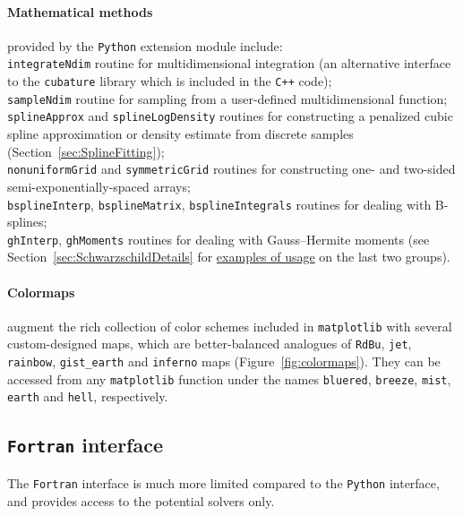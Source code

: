 \documentclass[12pt]{article}
\newcommand{\Cpp}  {\texttt{C++}\xspace}
\newcommand{\Python}{\texttt{Python}\xspace}
\newcommand{\Fortran}{\texttt{Fortran}\xspace}
\newcommand{\ppp}[1]{\textcolor{darkolive} {\texttt{#1}}}
\begin{document}
\paragraph{Mathematical methods} provided by the \Python extension module include:\\
\texttt{integrateNdim} routine for multidimensional integration (an alternative interface to the \texttt{cubature} library which is included in the \Cpp code);\\
\texttt{sampleNdim} routine for sampling from a user-defined multidimensional function;\\
\texttt{splineApprox} and \texttt{splineLogDensity} routines for constructing a penalized cubic spline approximation or density estimate from discrete samples (Section~\ref{sec:SplineFitting});\\
\texttt{nonuniformGrid} and \texttt{symmetricGrid} routines for constructing one- and two-sided semi-exponentially-spaced arrays;\\
\texttt{bsplineInterp}, \texttt{bsplineMatrix}, \texttt{bsplineIntegrals} routines for dealing with B-splines;\\
\texttt{ghInterp}, \texttt{ghMoments} routines for dealing with Gauss--Hermite moments (see Section~\ref{sec:SchwarzschildDetails} for \hyperref[sec:SchwarzschildExample]{examples of usage} on the last two groups).

\paragraph{Colormaps} augment the rich collection of color schemes included in \texttt{matplotlib} with several custom-designed maps, which are better-balanced analogues of \texttt{RdBu}, \texttt{jet}, \texttt{rainbow}, \texttt{gist_earth} and \texttt{inferno} maps (Figure~\ref{fig:colormaps}). They can be accessed from any \texttt{matplotlib} function under the names \ppp{bluered}, \ppp{breeze}, \ppp{mist}, \ppp{earth} and \ppp{hell}, respectively.


\subsection{\Fortran interface}  \label{sec:Fortran}

The \Fortran interface is much more limited compared to the \Python interface, and provides access to the potential solvers only. 
\end{document}
